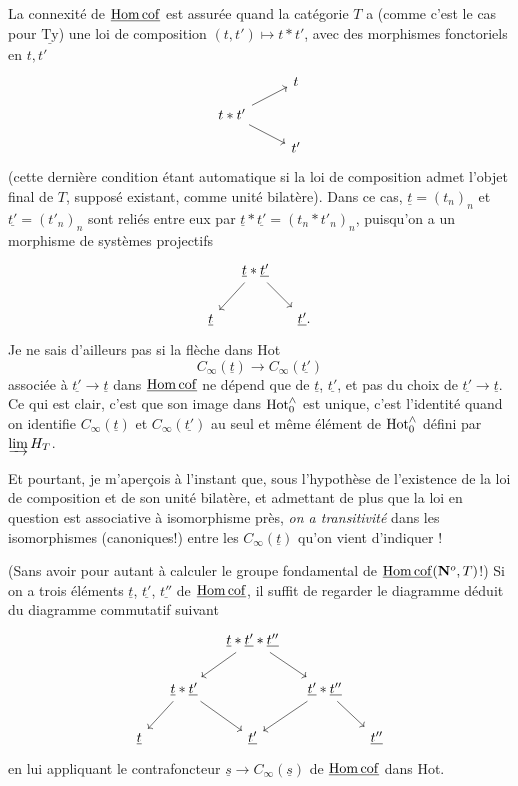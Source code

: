 La connexité de $\underline{\mathrm{Hom\,cof}}$ est assurée quand la catégorie $T$ a (comme c'est le cas pour $\underline{\mathrm{Ty}}$) une loi de composition $(t,t') \longmapsto t * t'$, avec des morphismes fonctoriels en $t, t'$
\[
\begin{tikzcd}[row sep=small]
 & t \\
t * t' \arrow[ru] \arrow[rd] & \\
 & t'
\end{tikzcd}
\]
(cette dernière condition étant automatique
si la loi de composition admet l'objet final de $T$, supposé existant, comme unité bilatère). Dans ce cas, $\underline{t} = (t_n)_n$ et $\underline{t'} = (t'_n)_n$ sont reliés entre eux par $\underline{t} * \underline{t'} = (t_n * t'_n)_n$, puisqu'on a un morphisme de systèmes projectifs
\[
\begin{tikzcd}[column sep=small]
 & \underline{t} * \underline{t'} \arrow[ld] \arrow[rd] & \\
\underline{t} & & \underline{t'}.
\end{tikzcd}
\]
Je ne sais d'ailleurs pas si la flèche dans Hot
\[
C_\infty(\underline{t}) \longrightarrow C_\infty(\underline{t'})
\]
associée à $\underline{t'} \longrightarrow \underline{t}$ dans $\underline{\mathrm{Hom\,cof}}$ ne dépend que de $\underline{t}$, $\underline{t'}$, et pas du choix de $\underline{t'} \longrightarrow \underline{t}$. Ce qui est clair, c'est que son image dans $\mathrm{Hot}^{\wedge}_{0}$ est unique, c'est l'identité quand on identifie $C_\infty(\underline{t})$ et $C_\infty(\underline{t'})$ au seul et même élément de $\mathrm{Hot}^{\wedge}_{0}$ défini par $\varinjlim H_T$.

Et pourtant, je m'aperçois à l'instant que, sous l'hypothèse de l'existence de la loi de composition et de son unité bilatère, et admettant de plus que la loi en question est associative à isomorphisme près, \textit{on a transitivité} dans les isomorphismes (canoniques!) entre les $C_\infty(\underline{t})$ qu'on vient d'indiquer !

(Sans avoir pour autant à calculer le groupe fondamental de $\underline{\mathrm{Hom\,cof}}(\mathbf{N}^o, T)$!) Si on a trois éléments $\underline{t}$, $\underline{t'}$, $\underline{t''}$ de $\underline{\mathrm{Hom\,cof}}$, il suffit de regarder le diagramme déduit du diagramme commutatif suivant
\[
\begin{tikzcd}[column sep=small]
 & & \underline{t} * \underline{t'} * \underline{t''} \arrow[ld] \arrow[rd] & & \\
 & \underline{t} * \underline{t'} \arrow[ld] \arrow[rd] & & \underline{t'} * \underline{t''} \arrow[ld] \arrow[rd] & \\
\underline{t} & & \underline{t'} & & \underline{t''}
\end{tikzcd}
\]
en lui appliquant le contrafoncteur $\underline{s} \longrightarrow C_\infty(\underline{s})$ de $\underline{\mathrm{Hom\,cof}}$ dans Hot.

